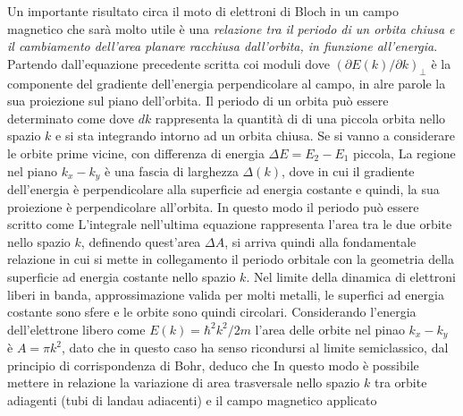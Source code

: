 Un importante risultato circa il moto di elettroni di Bloch in un campo magnetico che sar\`a molto utile \`e una \textit{relazione tra il periodo di un orbita chiusa e il cambiamento dell'area planare racchiusa dall'orbita, in fiunzione all'energia}. Partendo dall'equazione precedente scritta coi moduli
dove $(\partial E(k)/ \partial k)_\perp$ \`e la componente del gradiente dell'energia perpendicolare al campo, in alre parole la sua proiezione sul piano dell'orbita. Il periodo di un orbita pu\`o essere determinato come 
dove  $dk$ rappresenta la quantit\`a di di una piccola orbita nello spazio $k$ e si sta integrando intorno ad un orbita chiusa. Se si vanno a considerare le orbite prime vicine, con differenza di energia $\Delta E = E_2-E_1$ piccola, La regione nel piano $k_x-k_y$ \`e una fascia di larghezza $\Delta(k)$, dove 
in cui il gradiente dell'energia \`e perpendicolare alla superficie ad energia costante e quindi, la sua proiezione \`e perpendicolare all'orbita. In questo modo il periodo pu\`o essere scritto come
L'integrale nell'ultima equazione rappresenta l'area tra le due orbite nello spazio $k$, definendo quest'area $\Delta A$, si arriva quindi alla fondamentale relazione
in cui si mette in collegamento il periodo orbitale con la geometria della superficie ad energia costante nello spazio $k$. Nel limite della dinamica di elettroni liberi in banda, approssimazione valida per molti metalli, le superfici ad energia costante sono sfere e le orbite sono quindi circolari. Considerando l'energia dell'elettrone libero come $E(k) = \hbar^2 k^2 / 2 m $ l'area delle orbite nel pinao $k_x-k_y$ \`e $A=\pi k^2$, dato che in questo caso ha senso ricondursi al limite semiclassico, dal principio di corrispondenza di Bohr, deduco che
In questo modo \`e possibile mettere in relazione la variazione di area trasversale nello spazio $k$ tra orbite adiagenti (tubi di landau adiacenti) e il campo magnetico applicato
